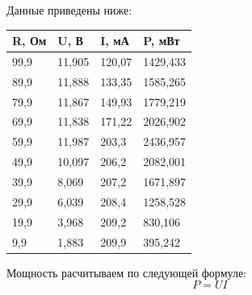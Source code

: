 \documentclass[a4paper,12pt]{article}
\begin{document}
\newpage
Данные приведены ниже:
\begin{table}[!ht]
    \centering
    \begin{tabular}{|l|l|l|l|}
    \hline
        R, Ом & U, В & I, мА & P, мВт \\ \hline
        99,9 & 11,905 & 120,07 & 1429,433 \\ \hline
        89,9 & 11,888 & 133,35 & 1585,265 \\ \hline
        79,9 & 11,867 & 149,93 & 1779,219 \\ \hline
        69,9 & 11,838 & 171,22 & 2026,902 \\ \hline
        59,9 & 11,987 & 203,3 & 2436,957 \\ \hline
        49,9 & 10,097 & 206,2 & 2082,001 \\ \hline
        39,9 & 8,069 & 207,2 & 1671,897 \\ \hline
        29,9 & 6,039 & 208,4 & 1258,528 \\ \hline
        19,9 & 3,968 & 209,2 & 830,106 \\ \hline
        9,9 & 1,883 & 209,9 & 395,242 \\ \hline
    \end{tabular}
\end{table}

Мощность расчитываем по следующей формуле:
\begin{equation}
    P = UI
\end{equation}
\end{document}
